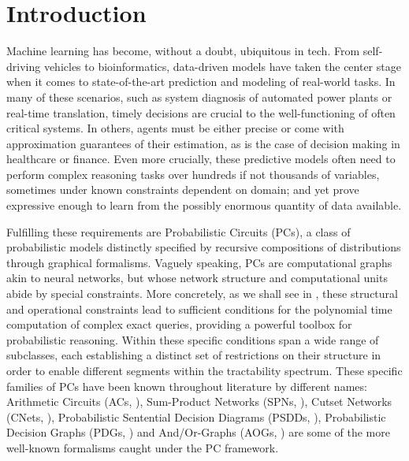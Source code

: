 \chapter{Introduction}

Machine learning has become, without a doubt, ubiquitous in tech. From self-driving vehicles to
bioinformatics, data-driven models have taken the center stage when it comes to state-of-the-art
prediction and modeling of real-world tasks. In many of these scenarios, such as system diagnosis
of automated power plants or real-time translation, timely decisions are crucial to the
well-functioning of often critical systems. In others, agents must be either precise or come with
approximation guarantees of their estimation, as is the case of decision making in healthcare or
finance. Even more crucially, these predictive models often need to perform complex reasoning tasks
over hundreds if not thousands of variables, sometimes under known constraints dependent on
domain; and yet prove expressive enough to learn from the possibly enormous quantity of data
available.

Fulfilling these requirements are Probabilistic Circuits (PCs), a class of probabilistic models
distinctly specified by recursive compositions of distributions through graphical formalisms.
Vaguely speaking, PCs are computational graphs akin to neural networks, but whose network structure
and computational units abide by special constraints. More concretely, as we shall see in
, these structural and operational constraints lead to sufficient conditions for the
polynomial time computation of complex exact queries, providing a powerful toolbox for
probabilistic reasoning. Within these specific conditions span a wide range of subclasses, each
establishing a distinct set of restrictions on their structure in order to enable different
segments within the tractability spectrum. These specific families of PCs have been known
throughout literature by different names: Arithmetic Circuits (ACs, \cite{darwiche03}), Sum-Product
Networks (SPNs, \cite{poon11}), Cutset Networks (CNets, \cite{rahman14}), Probabilistic Sentential
Decision Diagrams (PSDDs, \cite{kisa14}), Probabilistic Decision Graphs (PDGs, \cite{jaeger04}) and
And/Or-Graphs (AOGs, \cite{dechter07}) are some of the more well-known formalisms caught under the
PC framework.

